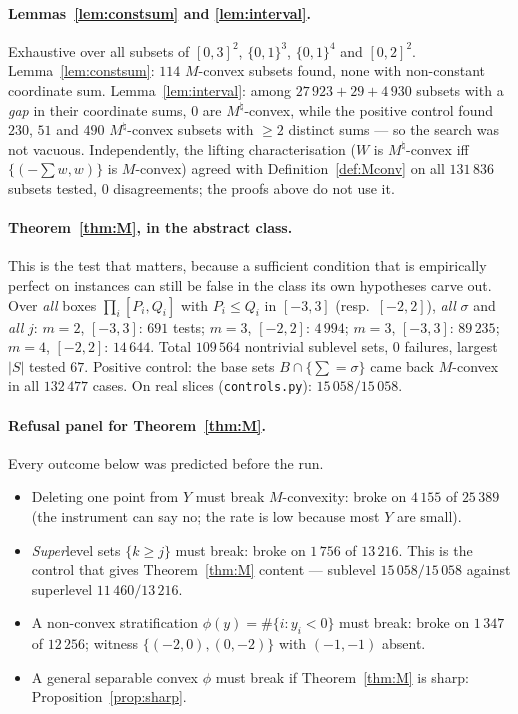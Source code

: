 \documentclass[11pt]{article}
\theoremstyle{plain}
\theoremstyle{definition}
\begin{document}
\paragraph{Lemmas~\ref{lem:constsum} and \ref{lem:interval}.} Exhaustive over all
subsets of $[0,3]^2$, $\{0,1\}^3$, $\{0,1\}^4$ and $[0,2]^2$. Lemma~\ref{lem:constsum}:
$114$ $M$-convex subsets found, none with non-constant coordinate sum.
Lemma~\ref{lem:interval}: among $27\,923+29+4\,930$ subsets with a \emph{gap} in their
coordinate sums, $0$ are $M^\natural$-convex, while the positive control found $230$, $51$
and $490$ $M^\natural$-convex subsets with $\ge2$ distinct sums --- so the search was not
vacuous. Independently, the lifting characterisation ($W$ is $M^\natural$-convex iff
$\{(-\sum w,w)\}$ is $M$-convex) agreed with Definition~\ref{def:Mconv} on all $131\,836$
subsets tested, $0$ disagreements; the proofs above do not use it.

\paragraph{Theorem~\ref{thm:M}, in the abstract class.} This is the test that matters,
because a sufficient condition that is empirically perfect on instances can still be false
in the class its own hypotheses carve out. Over \emph{all} boxes
$\prod_i[P_i,Q_i]$ with $P_i\le Q_i$ in $[-3,3]$ (resp.\ $[-2,2]$), \emph{all} $\sigma$ and
\emph{all} $j$: $m=2$, $[-3,3]$: $691$ tests; $m=3$, $[-2,2]$: $4\,994$; $m=3$, $[-3,3]$:
$89\,235$; $m=4$, $[-2,2]$: $14\,644$. Total $109\,564$ nontrivial sublevel sets, $0$
failures, largest $|S|$ tested $67$. Positive control: the base sets $B\cap\{\sum=\sigma\}$
came back $M$-convex in all $132\,477$ cases. On real slices (\texttt{controls.py}):
$15\,058/15\,058$.

\paragraph{Refusal panel for Theorem~\ref{thm:M}.} Every outcome below was predicted
before the run.
\begin{itemize}
\item Deleting one point from $Y$ must break $M$-convexity: broke on $4\,155$ of
  $25\,389$ (the instrument can say no; the rate is low because most $Y$ are small).
\item \emph{Super}level sets $\{k\ge j\}$ must break: broke on $1\,756$ of $13\,216$.
  This is the control that gives Theorem~\ref{thm:M} content --- sublevel $15\,058/15\,058$
  against superlevel $11\,460/13\,216$.
\item A non-convex stratification $\phi(y)=\#\{i:y_i<0\}$ must break: broke on $1\,347$ of
  $12\,256$; witness $\{(-2,0),(0,-2)\}$ with $(-1,-1)$ absent.
\item A general separable convex $\phi$ must break if Theorem~\ref{thm:M} is sharp:
  Proposition~\ref{prop:sharp}.
\end{itemize}
\end{document}
